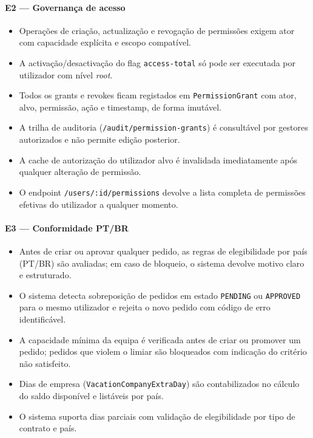 \documentclass[11pt,a4paper,twoside]{article}
\begin{document}
\paragraph{E2 — Governança de acesso}
\begin{itemize}
  \item Operações de criação, actualização e revogação de permissões exigem ator com capacidade explícita e escopo compatível.
  \item A activação/desactivação do flag \texttt{access-total} só pode ser executada por utilizador com nível \textit{root}.
  \item Todos os grants e revokes ficam registados em \texttt{PermissionGrant} com ator, alvo, permissão, ação e timestamp, de forma imutável.
  \item A trilha de auditoria (\texttt{/audit/permission-grants}) é consultável por gestores autorizados e não permite edição posterior.
  \item A cache de autorização do utilizador alvo é invalidada imediatamente após qualquer alteração de permissão.
  \item O endpoint \texttt{/users/:id/permissions} devolve a lista completa de permissões efetivas do utilizador a qualquer momento.
\end{itemize}

\paragraph{E3 — Conformidade PT/BR}
\begin{itemize}
  \item Antes de criar ou aprovar qualquer pedido, as regras de elegibilidade por país (PT/BR) são avaliadas; em caso de bloqueio, o sistema devolve motivo claro e estruturado.
  \item O sistema detecta sobreposição de pedidos em estado \texttt{PENDING} ou \texttt{APPROVED} para o mesmo utilizador e rejeita o novo pedido com código de erro identificável.
  \item A capacidade mínima da equipa é verificada antes de criar ou promover um pedido; pedidos que violem o limiar são bloqueados com indicação do critério não satisfeito.
  \item Dias de empresa (\texttt{VacationCompanyExtraDay}) são contabilizados no cálculo do saldo disponível e listáveis por país.
  \item O sistema suporta dias parciais com validação de elegibilidade por tipo de contrato e país.
\end{itemize}
\end{document}
